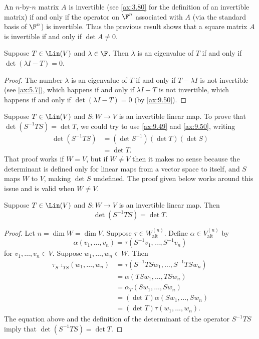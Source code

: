 An $n$-by-$n$ matrix $A$ is invertible (see \ref{ax:3.80} for the definition of
an invertible matrix) if and only if the operator on $\F^n$ associated with
$A$ (via the standard basis of $\F^n$) is invertible. Thus the previous result
shows that a square matrix $A$ is invertible if and only if $\det A\ne0$.

\begin{result}\label{ax:9.51}
Suppose $T\in\Lin(V)$ and $\lambda\in\F$. Then $\lambda$ is an eigenvalue of
$T$ if and only if $\det(\lambda I-T)=0$.
\end{result}

\begin{proof}
The number $\lambda$ is an eigenvalue of $T$ if and only if $T-\lambda I$ is
not invertible (see \ref{ax:5.7}), which happens if and only if $\lambda I-T$
is not invertible, which happens if and only if $\det(\lambda I-T)=0$ (by
\ref{ax:9.50}).
\end{proof}

Suppose $T\in\Lin(V)$ and $S\colon W\to V$ is an invertible linear map. To
prove that $\det(S^{-1}TS)=\det T$, we could try to use \ref{ax:9.49} and
\ref{ax:9.50}, writing
\begin{align*}
\det(S^{-1}TS) &= (\det S^{-1})(\det T)(\det S)\\
               &= \det T.
\end{align*}
That proof works if $W=V$, but if $W\ne V$ then it makes no sense because the
determinant is defined only for linear maps from a vector space to itself, and
$S$ maps $W$ to $V$, making $\det S$ undefined. The proof given below works
around this issue and is valid when $W\ne V$.

\begin{result}\label{ax:9.52}
Suppose $T\in\Lin(V)$ and $S\colon W\to V$ is an invertible linear map. Then
\[ \det(S^{-1}TS) = \det T. \]
\end{result}

\begin{proof}
Let $n=\dim W=\dim V$. Suppose $\tau\in W_{\mathrm{alt}}^{(n)}$. Define
$\alpha\in V_{\mathrm{alt}}^{(n)}$ by
\[ \alpha(v_1,\dots,v_n) = \tau(S^{-1}v_1,\dots,S^{-1}v_n) \]
for $v_1,\dots,v_n\in V$. Suppose $w_1,\dots,w_n\in W$. Then
\begin{align*}
\tau_{S^{-1}TS}(w_1,\dots,w_n) &= \tau(S^{-1}TSw_1,\dots,S^{-1}TSw_n)\\
  &= \alpha(TSw_1,\dots,TSw_n)\\
  &= \alpha_T(Sw_1,\dots,Sw_n)\\
  &= (\det T)\alpha(Sw_1,\dots,Sw_n)\\
  &= (\det T)\tau(w_1,\dots,w_n).
\end{align*}
The equation above and the definition of the determinant of the operator
$S^{-1}TS$ imply that $\det(S^{-1}TS)=\det T$.
\end{proof}

